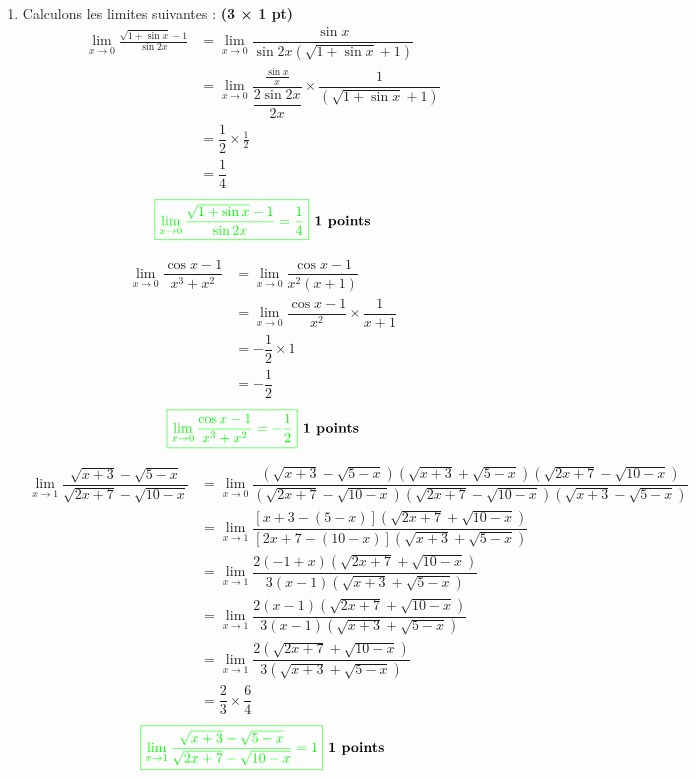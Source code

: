 \documentclass[12pt,a4paper]{article}
\begin{document}
\begin{enumerate}
    \item Calculons les limites suivantes : \textbf{(3 × 1 pt)}
    \begin{align*}
    \lim_{x \to 0} \frac{\sqrt{1+\sin x} - 1}{\sin 2x}&=\lim_{x \to 0} \dfrac{\sin x }{\sin 2x\left( \sqrt{1+\sin x} + 1\right) }\\
    &=\lim_{x \to 0} \dfrac{\frac{\sin x}{x} }{\dfrac{2\sin 2x}{2x}}\times \dfrac{1}{\left(\sqrt{1+\sin x} + 1\right)}\\
    &=\dfrac{1}{2}\times\frac{1}{2}\\
    &=\dfrac{1}{4}
    \end{align*}
\[
\textcolor{green}{\boxed{ \lim_{x \to 0} \dfrac{\sqrt{1+\sin x} - 1}{\sin 2x}=\frac{1}{4}  }} \textbf{ 1 points}
\]

    \begin{align*}
    \lim_{x \to 0} \dfrac{\cos x - 1}{x^3 + x^2}&=\lim_{x \to 0}\dfrac{\cos x - 1}{x^2(x + 1)}\\
    &=\lim_{x \to 0} \dfrac{\cos x - 1}{x^{2}} \times \dfrac{1}{x+1}\\
    &=-\dfrac{1}{2}\times1\\
    &=-\dfrac{1}{2}
    \end{align*}
\[
\textcolor{green}{\boxed{ \lim_{x \to 0} \dfrac{\cos x - 1}{x^3 + x^2}=-\frac{1}{2}  }} \textbf{ 1 points}
\]

    \begin{align*}
    \lim_{x \to 1} \dfrac{\sqrt{x + 3} - \sqrt{5 - x}}{\sqrt{2x + 7} - \sqrt{10 - x}}&=\lim_{x \to 0}\dfrac{\left( \sqrt{x + 3} - \sqrt{5 - x}\right)\left( \sqrt{x + 3} + \sqrt{5 - x}\right)\left( \sqrt{2x + 7} - \sqrt{10 - x}\right) }{\left( \sqrt{2x + 7} - \sqrt{10 - x}\right) \left( \sqrt{2x + 7} - \sqrt{10 - x}\right) \left( \sqrt{x + 3} - \sqrt{5 - x}\right)}\\
    &=\lim_{x \to 1} \dfrac{\left[ x + 3 - (5 - x)\right]\left( \sqrt{2x + 7} + \sqrt{10 - x}\right) }{ \left[  2x + 7 - (10 - x) \right]  \left( \sqrt{x + 3} + \sqrt{5 - x}\right)}\\
    &=\lim_{x \to 1} \dfrac{2(-1+x)\left( \sqrt{2x + 7} + \sqrt{10 - x}\right) }{ 3( x - 1 )  \left( \sqrt{x + 3} + \sqrt{5 - x}\right)}\\
    &=\lim_{x \to 1} \dfrac{2(x-1)\left( \sqrt{2x + 7} + \sqrt{10 - x}\right) }{ 3( x - 1 )  \left( \sqrt{x + 3} + \sqrt{5 - x}\right)}\\
    &=\lim_{x \to 1} \dfrac{2\left( \sqrt{2x + 7} + \sqrt{10 - x}\right) }{ 3\left( \sqrt{x + 3} + \sqrt{5 - x}\right)}\\
    &=\dfrac{2}{3} \times \dfrac{6}{4}
    \end{align*}
\[
\textcolor{green}{\boxed{ \lim_{x \to 1} \dfrac{\sqrt{x + 3} - \sqrt{5 - x}}{\sqrt{2x + 7} - \sqrt{10 - x}}=1 }} \textbf{ 1 points}
\]


\end{enumerate}
\end{document}
